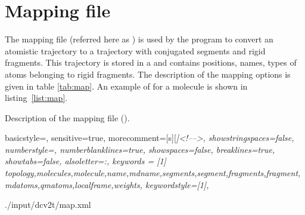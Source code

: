\section{Mapping file}
\label{sec:xmlmap}
The mapping file (referred here as \xmlcsg) is used by the program \ctpmap to convert an atomistic trajectory to a trajectory with conjugated segments and rigid fragments. This trajectory is stored in a  and contains positions, names, types of atoms belonging to rigid fragments. The description of the mapping options is given in table \ref{tab:map}. An example of \xmlcsg for a \dcvt molecule is shown in listing~\ref{list:map}. 
%
\begin{table}[h]
\label{tab:map}
\caption{Description of the \xml mapping file (\xmlcsg).}
 {\footnotesize }
\end{table}
%
 {
   basicstyle=\ttfamily\scriptsize,
   sensitive=true,
   morecomment=[s][\color{gray}\rmfamily\itshape]{<!--}{-->}, 
   showstringspaces=false,
   numberstyle=\scriptsize,
   numberblanklines=true,
   showspaces=false,
   breaklines=true,
   showtabs=false,
   alsoletter={:},
   keywords = [1]
   { topology,molecules,molecule,name,mdname,segments,segment,fragments,fragment,mdatoms,qmatoms,localframe,weights},
   keywordstyle={[1]\color{blue}},
}

%
{./input/dcv2t/map.xml}
